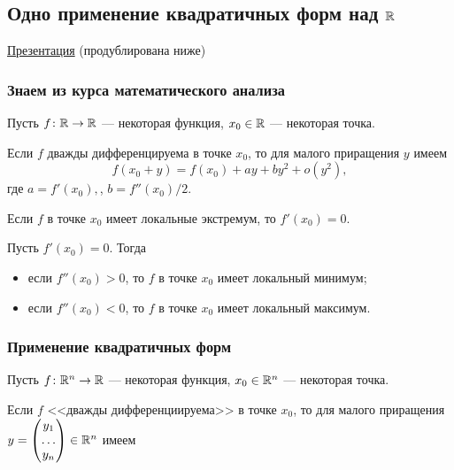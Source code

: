 \subsection{Одно применение квадратичных форм над $\mathbb{R}$}

\href{https://www.dropbox.com/s/wwv38znnuts9rld/Qforms_application.pdf?dl=0}{Презентация} (продублирована ниже)

\subsubsection{Знаем из курса математического анализа}

Пусть $f\colon \mathbb{R} \to \mathbb{R}$ --- некоторая функция, $x_0 \in \mathbb{R}$ --- некоторая точка.

Если $f$ дважды дифференцируема в точке $x_0$, то для малого приращения $y$ имеем
\begin{equation*}
    f(x_0 + y) = f(x_0) + ay + by^2 + o(y^2)
,\end{equation*}
где $a = f'(x_0),$, $b = f''(x_0) / 2$.

\begin{proposal}
    Если $f$ в точке $x_0$ имеет локальные экстремум, то $f'(x_0) = 0$.
\end{proposal}

\begin{proposal}
    Пусть $f'(x_0) = 0$. Тогда
    \begin{itemize}[nosep]
    \item если $f''(x_0) > 0$, то $f$ в точке $x_0$ имеет локальный минимум;
    \item если $f''(x_0) < 0$, то $f$ в точке $x_0$ имеет локальный максимум.
    \end{itemize}
\end{proposal}

\subsubsection{Применение квадратичных форм}

Пусть $f\colon \mathbb{R}^n \to \mathbb{R}$ --- некоторая функция, $x_0 \in \mathbb{R}^n$ --- некоторая точка.

Если $f$ <<дважды дифференциируема>> в точке $x_0$, то для малого приращения $y = \begin{pmatrix} y_1 \\ \dots \\ y_n \end{pmatrix} \in \mathbb{R}^n$ имеем

